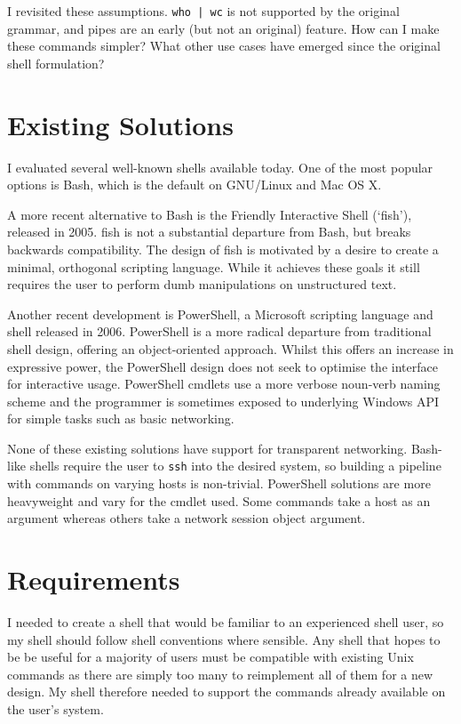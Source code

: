 \documentclass[12pt,twoside,notitlepage]{report}
\begin{document}
I revisited these assumptions. \texttt{who | wc} is not supported by the
original grammar, and pipes are an early (but not an original) feature. How can
I make these commands simpler? What other use cases have emerged since the
original shell formulation?

\section{Existing Solutions}
I evaluated several well-known shells available today. One of the most popular
options is Bash, which is the default on GNU/Linux and Mac OS X.

A more recent alternative to Bash is the Friendly Interactive Shell (`fish'),
released in 2005. fish is not a substantial departure from Bash, but breaks
backwards compatibility. The design of fish\cite{fishdesign} is motivated by a
desire to create a minimal, orthogonal scripting language. While it achieves
these goals it still requires the user to perform dumb manipulations on
unstructured text.

Another recent development is PowerShell, a Microsoft scripting language and
shell released in 2006. PowerShell is a more radical departure from traditional
shell design, offering an object-oriented approach. Whilst this offers an
increase in expressive power, the PowerShell design does not seek to optimise
the interface for interactive usage. PowerShell cmdlets use a more verbose
noun-verb naming scheme and the programmer is sometimes exposed to underlying
Windows API for simple tasks such as basic networking.

None of these existing solutions have support for transparent
networking. Bash-like shells require the user to {\tt ssh} into the desired
system, so building a pipeline with commands on varying hosts is
non-trivial. PowerShell solutions are more heavyweight and vary for the cmdlet
used. Some commands take a host as an argument whereas others take a network
session object argument.

\section{Requirements}
I needed to create a shell that would be familiar to an experienced shell user,
so my shell should follow shell conventions where sensible. Any shell that hopes
to be be useful for a majority of users must be compatible with existing Unix
commands as there are simply too many to reimplement all of them for a new
design. My shell therefore needed to support the commands already available on
the user's system.
\end{document}
